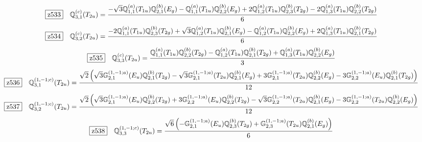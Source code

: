 \documentclass[fleqn,10pt,landscape]{jsarticle}
\begin{document}
\begin{dmath*}
\hspace*{3mm}\fbox{z533}\quad \mathbb{Q}_{3,1}^{(c)}(T_{2u})=\frac{- \sqrt{3} \mathbb{Q}_{1,1}^{(a)}(T_{1u}) \mathbb{Q}_{2,1}^{(b)}(E_{g}) - \mathbb{Q}_{1,1}^{(a)}(T_{1u}) \mathbb{Q}_{2,2}^{(b)}(E_{g}) + 2 \mathbb{Q}_{1,2}^{(a)}(T_{1u}) \mathbb{Q}_{2,3}^{(b)}(T_{2g}) - 2 \mathbb{Q}_{1,3}^{(a)}(T_{1u}) \mathbb{Q}_{2,2}^{(b)}(T_{2g})}{6}
\end{dmath*}
\begin{dmath*}
\hspace*{3mm}\fbox{z534}\quad \mathbb{Q}_{3,2}^{(c)}(T_{2u})=\frac{- 2 \mathbb{Q}_{1,1}^{(a)}(T_{1u}) \mathbb{Q}_{2,3}^{(b)}(T_{2g}) + \sqrt{3} \mathbb{Q}_{1,2}^{(a)}(T_{1u}) \mathbb{Q}_{2,1}^{(b)}(E_{g}) - \mathbb{Q}_{1,2}^{(a)}(T_{1u}) \mathbb{Q}_{2,2}^{(b)}(E_{g}) + 2 \mathbb{Q}_{1,3}^{(a)}(T_{1u}) \mathbb{Q}_{2,1}^{(b)}(T_{2g})}{6}
\end{dmath*}
\begin{dmath*}
\hspace*{3mm}\fbox{z535}\quad \mathbb{Q}_{3,3}^{(c)}(T_{2u})=\frac{\mathbb{Q}_{1,1}^{(a)}(T_{1u}) \mathbb{Q}_{2,2}^{(b)}(T_{2g}) - \mathbb{Q}_{1,2}^{(a)}(T_{1u}) \mathbb{Q}_{2,1}^{(b)}(T_{2g}) + \mathbb{Q}_{1,3}^{(a)}(T_{1u}) \mathbb{Q}_{2,2}^{(b)}(E_{g})}{3}
\end{dmath*}
\begin{dmath*}
\hspace*{3mm}\fbox{z536}\quad \mathbb{Q}_{3,1}^{(1,-1;c)}(T_{2u})=\frac{\sqrt{2} \left(\sqrt{3} \mathbb{G}_{2,1}^{(1,-1;a)}(E_{u}) \mathbb{Q}_{2,1}^{(b)}(T_{2g}) - \sqrt{3} \mathbb{G}_{2,1}^{(1,-1;a)}(T_{2u}) \mathbb{Q}_{2,1}^{(b)}(E_{g}) + 3 \mathbb{G}_{2,1}^{(1,-1;a)}(T_{2u}) \mathbb{Q}_{2,2}^{(b)}(E_{g}) - 3 \mathbb{G}_{2,2}^{(1,-1;a)}(E_{u}) \mathbb{Q}_{2,1}^{(b)}(T_{2g})\right)}{12}
\end{dmath*}
\begin{dmath*}
\hspace*{3mm}\fbox{z537}\quad \mathbb{Q}_{3,2}^{(1,-1;c)}(T_{2u})=\frac{\sqrt{2} \left(\sqrt{3} \mathbb{G}_{2,1}^{(1,-1;a)}(E_{u}) \mathbb{Q}_{2,2}^{(b)}(T_{2g}) + 3 \mathbb{G}_{2,2}^{(1,-1;a)}(E_{u}) \mathbb{Q}_{2,2}^{(b)}(T_{2g}) - \sqrt{3} \mathbb{G}_{2,2}^{(1,-1;a)}(T_{2u}) \mathbb{Q}_{2,1}^{(b)}(E_{g}) - 3 \mathbb{G}_{2,2}^{(1,-1;a)}(T_{2u}) \mathbb{Q}_{2,2}^{(b)}(E_{g})\right)}{12}
\end{dmath*}
\begin{dmath*}
\hspace*{3mm}\fbox{z538}\quad \mathbb{Q}_{3,3}^{(1,-1;c)}(T_{2u})=\frac{\sqrt{6} \left(- \mathbb{G}_{2,1}^{(1,-1;a)}(E_{u}) \mathbb{Q}_{2,3}^{(b)}(T_{2g}) + \mathbb{G}_{2,3}^{(1,-1;a)}(T_{2u}) \mathbb{Q}_{2,1}^{(b)}(E_{g})\right)}{6}
\end{dmath*}
\end{document}
